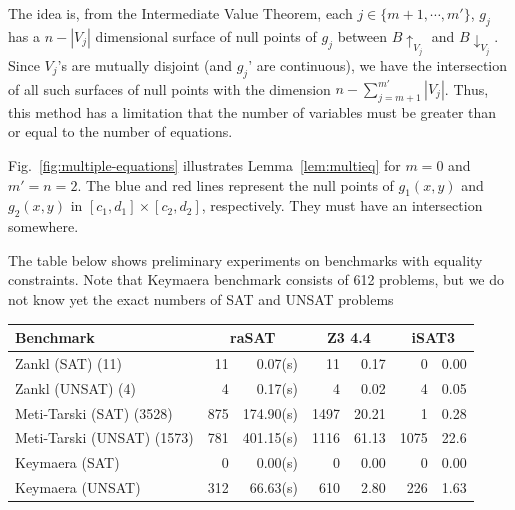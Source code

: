 \documentclass[runningheads,a4paper,oribibl]{llncs}
\begin{document}
The idea is, from the Intermediate Value Theorem,
each $j \in \{m+1, \cdots, m'\}$, $g_j$ has a $n - |V_{j}|$ dimensional surface of
null points of $g_j$ between $B\uparrow_{V_j}$ and $B\downarrow_{V_j}$.
Since $V_j$'s are mutually disjoint (and $g_j$' are continuous),
we have the intersection of all such surfaces of null points with
the dimension $n - \sum_{j=m+1}^{m'} |V_j|$.
Thus, this method has a limitation that 
the number of variables must be greater than or equal to the number of equations.

Fig.~\ref{fig:multiple-equations} illustrates Lemma~\ref{lem:multieq} for $m = 0$ and
$m' = n = 2$. 
The blue and red lines represent the null points of $g_1(x,y)$ and $g_2(x,y)$ in
$[c_1,d_1] \times [c_2,d_2]$, respectively.
They must have an intersection somewhere. %

The table below shows preliminary experiments on benchmarks with equality constraints.
Note that Keymaera benchmark consists of 612 problems, but we do not know yet
the exact numbers of SAT and UNSAT problems 

\begin{center}
\begin{tabular}{ | l | r | r | r | r  | r | r |}
\hline
\multicolumn{1}{|l|}{Benchmark} & \multicolumn{2}{c|}{\bf raSAT} &
\multicolumn{2}{c|}{\bf Z3 4.4} & \multicolumn{2}{c|}{\bf iSAT3}\\
\hline
Zankl (SAT) (11) & 11 & 0.07(s) & 11 & 0.17 & 0 & 0.00 \\
\hline
Zankl (UNSAT) (4) & 4 & 0.17(s) &  4 & 0.02 & 4 & 0.05 \\
\hline
Meti-Tarski (SAT) (3528)   & 875 & 174.90(s) & 1497 & 20.21 & 1 & 0.28  \\
\hline 
Meti-Tarski (UNSAT) (1573) & 781 & 401.15(s) & 1116 & 61.13 & 1075 & 22.6 \\
\hline
Keymaera (SAT)   & 0 & 0.00(s) & 0 & 0.00 & 0 & 0.00 \\
\hline
Keymaera (UNSAT) & 312 & 66.63(s) & 610 & 2.80 & 226 & 1.63\\
\hline 
\end{tabular}
\end{center}
\end{document}
